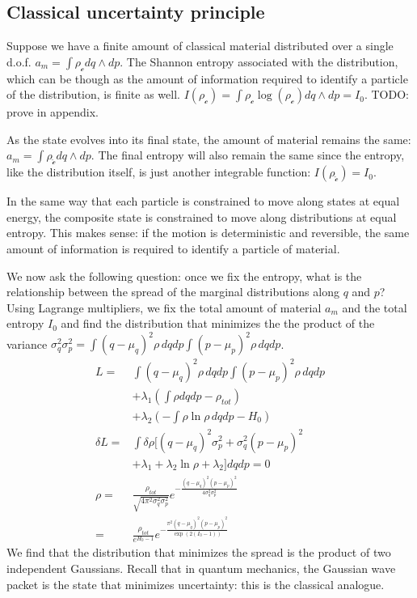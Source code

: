 \documentclass[aps,pra,10pt,twocolumn,floatfix,nofootinbib]{revtex4-1}
\numberwithin{equation}{section}
\theoremstyle{definition}
\begin{document}
\subsection{Classical uncertainty principle}

Suppose we have a finite amount of classical material distributed over a single d.o.f. $a_m = \int \rho_\mathcal{c} dq \wedge dp$. The Shannon entropy associated with the distribution, which can be though as the amount of information required to identify a particle of the distribution, is finite as well. $I(\rho_\mathcal{c}) = \int \rho_\mathcal{c} \log (\rho_\mathcal{c})  dq \wedge dp = I_0$. TODO: prove in appendix.

As the state evolves into its final state, the amount of material remains the same: $a_m = \int \rho_{\hat{\mathcal{c}}} dq \wedge dp$. The final entropy will also remain the same since the entropy, like the distribution itself, is just another integrable function: $I(\rho_{\hat{\mathcal{c}}}) = I_0$.

In the same way that each particle is constrained to move along states at equal energy, the composite state is constrained to move along distributions at equal entropy. This makes sense: if the motion is deterministic and reversible, the same amount of information is required to identify a particle of material.

We now ask the following question: once we fix the entropy, what is the relationship between the spread of the marginal distributions along $q$ and $p$? Using Lagrange multipliers, we fix the total amount of material $a_m$ and the total entropy $I_0$ and find the distribution that minimizes the the product of the variance $\sigma_q^2 \sigma_p^2 = \int (q-\mu_q)^2 \rho \, dqdp \int (p-\mu_p)^2 \rho \, dqdp$.
\begin{align*}
L = &\int (q-\mu_q)^2 \rho \, dqdp \int (p-\mu_p)^2 \rho \, dqdp \\
&+ \lambda_1(\int \rho dqdp - \rho_{tot})\\
&+ \lambda_2(- \int \rho \ln \rho \, dqdp - H_0)\\
\delta L = &\int \delta \rho [(q-\mu_q)^2 \sigma_p^2 + \sigma_q^2 (p-\mu_p)^2 \\ &+ \lambda_1 + \lambda_2 \ln \rho + \lambda_2 ] dqdp = 0 \\
\rho = &\frac{\rho_{tot}}{ \sqrt{4 \pi ^2\sigma_q^2\sigma_p^2}} e^{-\frac{(q-\mu_q)^2(p-\mu_p)^2}{4\sigma_q^2\sigma_p^2}} \\
= &\frac{\rho_{tot}}{e^{H_0 - 1}} e^{-\frac{\pi ^2(q-\mu_q)^2(p-\mu_p)^2}{\exp (2(I_0 - 1))}}
\end{align*}
We find that the distribution that minimizes the spread is the product of two independent Gaussians. Recall that in quantum mechanics, the Gaussian wave packet is the state that minimizes uncertainty: this is the classical analogue.
\end{document}
